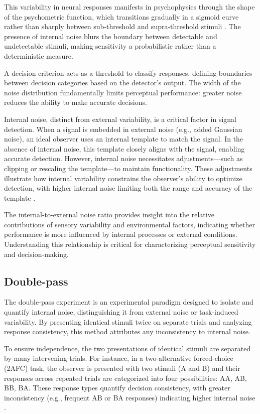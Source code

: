 This variability in neural responses manifests in psychophysics through the shape of the psychometric function, which transitions gradually in a sigmoid curve rather than sharply between sub-threshold and supra-threshold stimuli \cite{burgess_visual_1988}. The presence of internal noise blurs the boundary between detectable and undetectable stimuli, making sensitivity a probabilistic rather than a deterministic measure.


A decision criterion acts as a threshold to classify responses, defining boundaries between decision categories based on the detector's output. The width of the noise distribution fundamentally limits perceptual performance: greater noise reduces the ability to make accurate decisions.

Internal noise, distinct from external variability, is a critical factor in signal detection. When a signal is embedded in external noise (e.g., added Gaussian noise), an ideal observer uses an internal template to match the signal. In the absence of internal noise, this template closely aligns with the signal, enabling accurate detection. However, internal noise necessitates adjustments—such as clipping or rescaling the template—to maintain functionality. These adjustments illustrate how internal variability constrains the observer’s ability to optimize detection, with higher internal noise limiting both the range and accuracy of the template \cite{neri_optimal_2021}.

The internal-to-external noise ratio provides insight into the relative contributions of sensory variability and environmental factors, indicating whether performance is more influenced by internal processes or external conditions. Understanding this relationship is critical for characterizing perceptual sensitivity and decision-making.

\subsection {Double-pass} 
The double-pass experiment is an experimental paradigm designed to isolate and quantify internal noise, distinguishing it from external noise or task-induced variability. By presenting identical stimuli twice on separate trials and analyzing response consistency, this method attributes any inconsistency to internal noise.

To ensure independence, the two presentations of identical stimuli are separated by many intervening trials. For instance, in a two-alternative forced-choice (2AFC) task, the observer is presented with two stimuli (A and B) and their responses across repeated trials are categorized into four possibilities: AA, AB, BB, BA. These response types quantify decision consistency, with greater inconsistency (e.g., frequent AB or BA responses) indicating higher internal noise \cite{murray_optimal_2002}.

